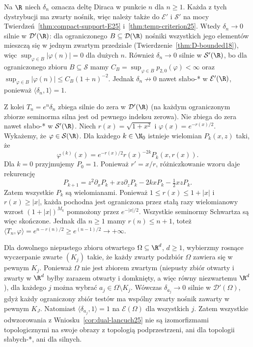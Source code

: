 \begin{przyklad}
\label{ex:escaping-deltas25}
Na $\R$ niech $\delta_n$ oznacza deltę Diraca w punkcie
$n$ dla $n\ge1$. Każda z tych dystrybucji ma zwarty
nośnik, więc należy także do $\mathcal E'$ i $\mathcal S'$
na mocy Twierdzeń~\ref{thm:compact-support-E25}
i~\ref{thm:temp-criterion25}.
Wtedy $\delta_n\to0$ silnie w $\mathcal D'(\R)$:
dla ograniczonego $B\subseteq\mathcal D(\R)$ nośniki
wszystkich jego elementów mieszczą się w jednym zwartym
przedziale (Twierdzenie~\ref{thm:D-bounded18}), więc
$\sup_{\varphi\in B}|\varphi(n)|=0$ dla dużych $n$.
Również $\delta_n\to0$ silnie w $\mathcal S'(\R)$, bo dla
ograniczonego zbioru $B\subseteq\mathcal S$ mamy
$C_B=\sup_{\varphi\in B}p_{2,0}(\varphi)<\infty$ oraz
$\sup_{\varphi\in B}|\varphi(n)|\le C_B(1+n)^{-2}$.
Jednak $\delta_n\not\to0$ nawet słabo-* w
$\mathcal E'(\R)$, ponieważ $\langle\delta_n,1\rangle=1$.

Z kolei $T_n=e^n\delta_n$ zbiega silnie do zera w
$\mathcal D'(\R)$ (na każdym ograniczonym zbiorze
seminorma silna jest od pewnego indeksu zerowa).
Nie zbiega do zera nawet słabo-* w $\mathcal S'(\R)$.
Niech $r(x)=\sqrt{1+x^2}$ i $\varphi(x)=e^{-r(x)/2}$.
Wykażemy, że $\varphi\in\mathcal S(\R)$.
Dla każdego $k\in\N_0$ istnieje wielomian $P_k(x,z)$
taki, że
\[
 \varphi^{(k)}(x)=e^{-r(x)/2}r(x)^{-2k}P_k(x,r(x)).
\]
Dla $k=0$ przyjmujemy $P_0=1$. Ponieważ $r'=x/r$,
różniczkowanie wzoru daje rekurencję
\[
 P_{k+1}=z^2\partial_x P_k+xz\partial_z P_k
          -2kxP_k-\tfrac12 xzP_k.
\]
Zatem wszystkie $P_k$ są wielomianami. Ponieważ
$1\le r(x)\le1+|x|$ i $r(x)\ge|x|$, każda pochodna
jest ograniczona przez stałą razy wielomianowy wzrost
$(1+|x|)^{M_k}$ pomnożony przez $e^{-|x|/2}$.
Wszystkie seminormy Schwartza są więc skończone.
Jednak dla $n\ge1$ mamy $r(n)\le n+1$, toteż
$\langle T_n,\varphi\rangle=e^{n-r(n)/2}
\ge e^{(n-1)/2}\to+\infty$.

Dla dowolnego niepustego zbioru otwartego
$\Omega\subseteq\R^d$, $d\ge1$, wybierzmy rosnące
wyczerpanie zwarte $(K_j)$ takie, że każdy zwarty
podzbiór $\Omega$ zawiera się w pewnym $K_j$.
Ponieważ $\Omega$ nie jest zbiorem zwartym (niepusty zbiór
otwarty i zwarty w $\R^d$ byłby zarazem otwarty
i domknięty, a więc równy niezwartemu $\R^d$),
dla każdego $j$ można wybrać
$a_j\in\Omega\setminus K_j$.
Wówczas $\delta_{a_j}\to0$ silnie w $\mathcal D'(\Omega)$,
gdyż każdy ograniczony zbiór testów ma wspólny zwarty
nośnik zawarty w pewnym $K_J$.
Natomiast $\langle\delta_{a_j},1\rangle=1$ na
$\mathcal E(\Omega)$ dla wszystkich $j$.
Zatem wszystkie odwzorowania z
Wniosku~\ref{cor:dual-lancuch25} nie są izomorfizmami
topologicznymi na swoje obrazy z topologią podprzestrzeni,
ani dla topologii słabych-*, ani dla silnych.
\end{przyklad}

